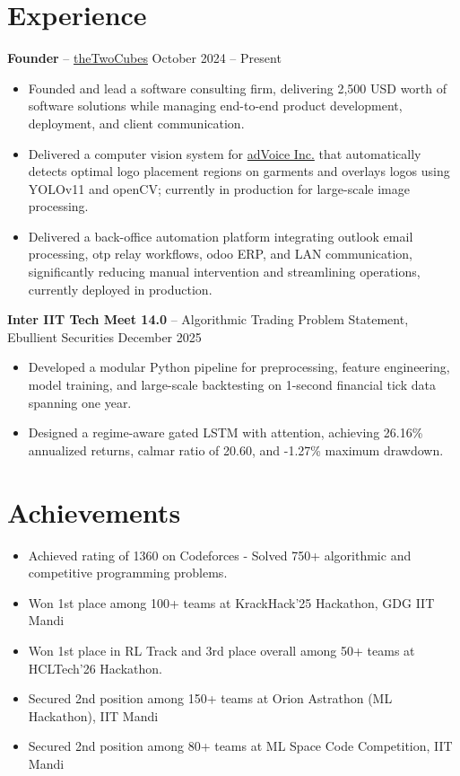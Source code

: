 \documentclass[a4paper,10pt]{article}
\begin{document}
\vspace{2pt}
\section*{Experience}
\vspace{2pt}

\textbf{Founder} -- \href{https://www.thetwocubes.com}{theTwoCubes}
\hfill October 2024 -- Present
\begin{itemize}[label=--]
    \item Founded and lead a software consulting firm, delivering 2,500 USD worth of software solutions while managing end-to-end product development, deployment, and client communication.
    \item Delivered a computer vision system for \href{https://advoice.co.in/}{adVoice Inc.} that automatically detects optimal logo placement regions on garments and overlays logos using YOLOv11 and openCV; currently in production for large-scale image processing.
    \item Delivered a back-office automation platform integrating outlook email processing, otp relay workflows, odoo ERP, and LAN communication, significantly reducing manual intervention and streamlining operations, currently deployed in production.
\end{itemize}


\textbf{Inter IIT Tech Meet 14.0} -- Algorithmic Trading Problem Statement, Ebullient Securities   
\hfill December 2025
\begin{itemize}[label=--]
    \item Developed a modular Python pipeline for preprocessing, feature engineering, model training, and large-scale backtesting on 1-second financial tick data spanning one year.
    \item Designed a regime-aware gated LSTM with attention, achieving 26.16\% annualized returns, calmar ratio of 20.60, and -1.27\% maximum drawdown.
\end{itemize}

\vspace{2pt}
\section*{Achievements}
\vspace{2pt}
\begin{itemize}[label=--]
    \item Achieved rating of 1360 on Codeforces - Solved 750+ algorithmic and competitive programming problems.
    \item Won 1st place among 100+ teams at KrackHack'25 Hackathon, GDG IIT Mandi  
    \item Won 1st place in RL Track and 3rd place overall among 50+ teams at HCLTech'26 Hackathon.  
    \item Secured 2nd position among 150+ teams at Orion Astrathon (ML Hackathon), IIT Mandi
    \item Secured 2nd position among 80+ teams at ML Space Code Competition, IIT Mandi
\end{itemize}
\end{document}
